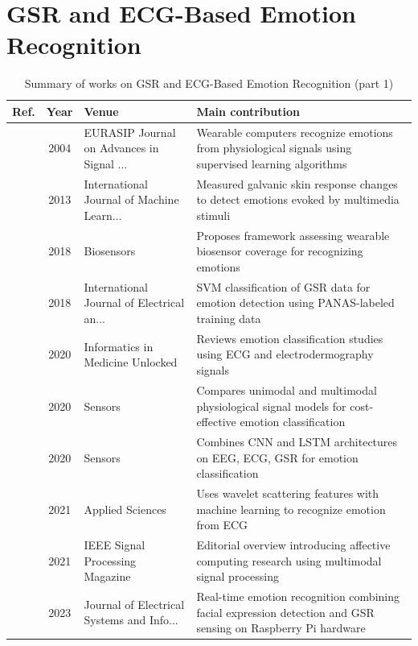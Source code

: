 \section{GSR and ECG-Based Emotion Recognition}\label{sec:theme1}
\begin{table}[!t]
\centering
\renewcommand{\arraystretch}{1.2}
\caption{Summary of works on GSR and ECG-Based Emotion Recognition (part 1)}\label{tab:theme1}
\begin{tabularx}{\textwidth}{@{}l c p{3.6cm} X@{}}
\toprule
\textbf{Ref.} & \textbf{Year} & \textbf{Venue} & \textbf{Main contribution} \\
\midrule
\cite{lisetti2004noninvasive} & 2004 & EURASIP Journal on Advances in Signal ... & Wearable computers recognize emotions from physiological signals using supervised learning algorithms \\
\cite{vijaya2013galvanic} & 2013 & International Journal of Machine Learn... & Measured galvanic skin response changes to detect emotions evoked by multimedia stimuli \\
\cite{hui2018coverage} & 2018 & Biosensors & Proposes framework assessing wearable biosensor coverage for recognizing emotions \\
\cite{setyohadi2018galvanic} & 2018 & International Journal of Electrical an... & SVM classification of GSR data for emotion detection using PANAS-labeled training data \\
\cite{bulagang2020review} & 2020 & Informatics in Medicine Unlocked & Reviews emotion classification studies using ECG and electrodermography signals \\
\cite{pinto2020multimodal} & 2020 & Sensors & Compares unimodal and multimodal physiological signal models for cost-effective emotion classification \\
\cite{dar2020cnn} & 2020 & Sensors & Combines CNN and LSTM architectures on EEG, ECG, GSR for emotion classification \\
\cite{sepulveda2021emotion} & 2021 & Applied Sciences & Uses wavelet scattering features with machine learning to recognize emotion from ECG \\
\cite{schuller2021intelligent} & 2021 & IEEE Signal Processing Magazine & Editorial overview introducing affective computing research using multimodal signal processing \\
\cite{patil2023face} & 2023 & Journal of Electrical Systems and Info... & Real-time emotion recognition combining facial expression detection and GSR sensing on Raspberry Pi hardware \\

\end{tabularx}
\end{table}
